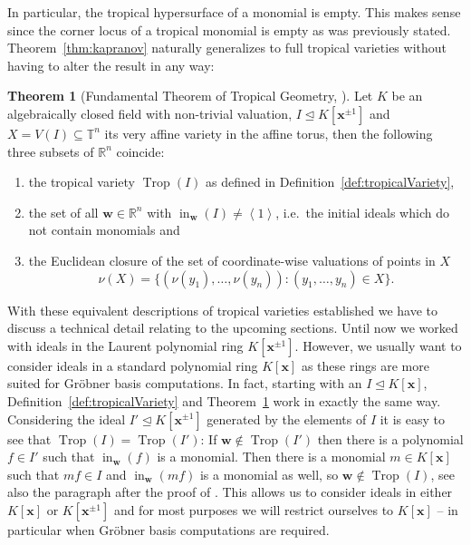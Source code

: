 \documentclass[
  paper=a4,
  titlepage,
  bibliography=totoc,
  listof=totoc,
  pagesize=pdftex
]{scrartcl}
\numberwithin{figure}{section}
\numberwithin{equation}{section}
\numberwithin{table}{section}
\newcommand*\setR{\mathds{R}}
\newcommand*\setT{\mathds{T}}
\newcommand*\ideal[1]{\left\langle #1 \right\rangle}
\let\vec\mathbf
\let\idealof\trianglelefteq
\DeclareMathOperator{\Trop}{Trop}
\DeclareMathOperator{\initial}{in}
\theoremstyle{definition}
\newtheorem{theorem}[definition]{Theorem}
\numberwithin{definition}{section}
\begin{document}
In particular, the tropical hypersurface of a monomial is empty. This makes sense since
the corner locus of a tropical monomial is empty as was previously stated.
Theorem~\ref{thm:kapranov} naturally generalizes to full tropical varieties without having
to alter the result in any way:

\begin{theorem}[Fundamental Theorem of Tropical Geometry,
  {\cite[Theorem~3.2.5]{sturmMacTrop}}] \label{thm:fundamentalThm}
  Let $K$ be an algebraically closed field with non-trivial valuation, $I \idealof K[\vec
  x^{\pm1}]$ and $X = V(I) \subseteq \setT^n$ its very affine variety in the affine torus,
  then the following three subsets of $\setR^n$ coincide:
  \begin{enumerate}
    \item the tropical variety $\Trop(I)$ as defined in
      Definition~\ref{def:tropicalVariety},
    \item the set of all $\vec w \in \setR^n$ with $\initial_{\vec w}(I) \neq \ideal1$,
      i.e.\ the initial ideals which do not contain monomials and
    \item \label{thm:fund:val}
      the Euclidean closure of the set of coordinate-wise valuations of points in $X$
      \[
        \nu(X) = \{ (\nu(y_1), \dots, \nu(y_n)) : (y_1, \dots, y_n) \in X \}.
      \]
  \end{enumerate}
\end{theorem}

With these equivalent descriptions of tropical varieties established we have to discuss a
technical detail relating to the upcoming sections. Until now we worked with ideals in the
Laurent polynomial ring $K[\vec x^{\pm1}]$. However, we usually want to consider ideals in
a standard polynomial ring $K[\vec x]$ as these rings are more suited for Gröbner basis
computations. In fact, starting with an $I \idealof K[\vec x]$,
Definition~\ref{def:tropicalVariety} and Theorem~\ref{thm:fundamentalThm} work in exactly
the same way. Considering the ideal $I' \idealof K[\vec x^{\pm1}]$ generated by the
elements of $I$ it is easy to see that $\Trop(I) = \Trop(I')$: If $\vec w \not\in
\Trop(I')$ then there is a polynomial $f \in I'$ such that $\initial_{\vec w}(f)$ is a
monomial. Then there is a monomial $m \in K[\vec x]$ such that $mf \in I$ and
$\initial_{\vec w}(mf)$ is a monomial as well, so $\vec w \not\in \Trop(I)$, see also the
paragraph after the proof of \cite[Corollary~3.3]{compTropVar}. This allows us to consider
ideals in either $K[\vec x]$ or $K[\vec x^{\pm1}]$ and for most purposes we will restrict
ourselves to $K[\vec x]$ -- in particular when Gröbner basis computations are required.
\end{document}
